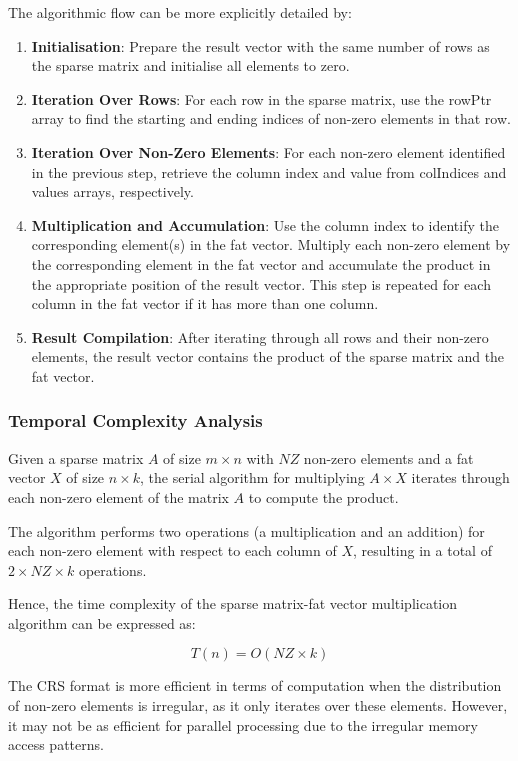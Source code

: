 \documentclass[12pt,oneside]{book} %
\begin{document}
The algorithmic flow can be more explicitly detailed by:
\begin{enumerate}
    \item \textbf{Initialisation}: Prepare the result vector with the same number of rows as the sparse matrix and initialise all elements to zero.
    \item \textbf{Iteration Over Rows}: For each row in the sparse matrix, use the rowPtr array to find the starting and ending indices of non-zero elements in that row.
    \item \textbf{Iteration Over Non-Zero Elements}: For each non-zero element identified in the previous step, retrieve the column index and value from colIndices and values arrays, respectively.
    \item \textbf{Multiplication and Accumulation}: Use the column index to identify the corresponding element(s) in the fat vector. Multiply each non-zero element by the corresponding element in the fat vector and accumulate the product in the appropriate position of the result vector. This step is repeated for each column in the fat vector if it has more than one column.
    \item \textbf{Result Compilation}: After iterating through all rows and their non-zero elements, the result vector contains the product of the sparse matrix and the fat vector.
\end{enumerate}

\subsubsection{Temporal Complexity Analysis}
Given a sparse matrix $A$ of size $m \times n$ with $NZ$ non-zero elements and
a fat vector $X$ of size $n \times k$, the serial algorithm for multiplying \(A
\times X\) iterates through each non-zero element of the matrix \(A\) to
compute the product.

The algorithm performs two operations (a multiplication and an addition) for
each non-zero element with respect to each column of \(X\), resulting in a
total of \(2 \times NZ \times k\) operations.

Hence, the time complexity of the sparse matrix-fat vector multiplication
algorithm can be expressed as:

\begin{equation}
    T(n) = O(NZ \times k)
\end{equation}

The CRS format is more efficient in terms of computation when the distribution
of non-zero elements is irregular, as it only iterates over these elements.
However, it may not be as efficient for parallel processing due to the
irregular memory access patterns.
\end{document}
